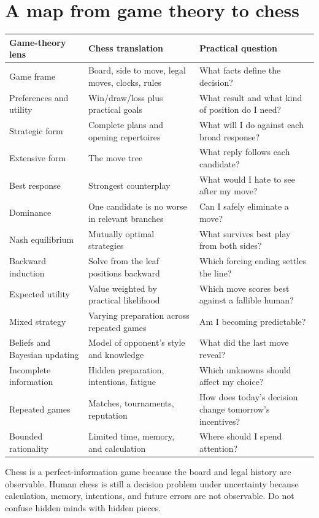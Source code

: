 \chapter*{A map from game theory to chess}

\begin{longtable}{@{}p{}p{}p{}@{}}
\toprule
\textbf{Game-theory lens} & \textbf{Chess translation} & \textbf{Practical question}\\
\midrule
Game frame & Board, side to move, legal moves, clocks, rules & What facts define the decision?\\
Preferences and utility & Win/draw/loss plus practical goals & What result and what kind of position do I need?\\
Strategic form & Complete plans and opening repertoires & What will I do against each broad response?\\
Extensive form & The move tree & What reply follows each candidate?\\
Best response & Strongest counterplay & What would I hate to see after my move?\\
Dominance & One candidate is no worse in relevant branches & Can I safely eliminate a move?\\
Nash equilibrium & Mutually optimal strategies & What survives best play from both sides?\\
Backward induction & Solve from the leaf positions backward & Which forcing ending settles the line?\\
Expected utility & Value weighted by practical likelihood & Which move scores best against a fallible human?\\
Mixed strategy & Varying preparation across repeated games & Am I becoming predictable?\\
Beliefs and Bayesian updating & Model of opponent's style and knowledge & What did the last move reveal?\\
Incomplete information & Hidden preparation, intentions, fatigue & Which unknowns should affect my choice?\\
Repeated games & Matches, tournaments, reputation & How does today's decision change tomorrow's incentives?\\
Bounded rationality & Limited time, memory, and calculation & Where should I spend attention?\\
\bottomrule
\end{longtable}

\begin{warningbox}[title={A crucial distinction}]
Chess is a perfect-information game because the board and legal history are observable. Human chess is still a decision problem under uncertainty because calculation, memory, intentions, and future errors are not observable. Do not confuse hidden minds with hidden pieces.
\end{warningbox}

\cleardoublepage
